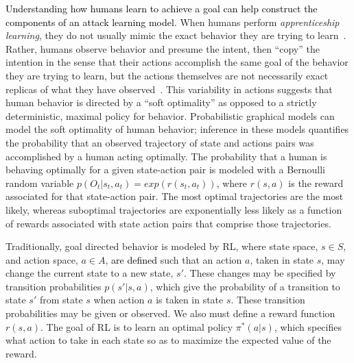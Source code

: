 \documentclass{article}
\newcommand\kjf[1]{\textcolor{black}{#1}}
\newcommand\nnn[1]{\textcolor{black}{#1}}
\begin{document}
\nnn{Understanding how humans \kjf{learn} to achieve a goal can help construct the components of an attack learning model.} 
When humans perform \emph{apprenticeship learning}, they do not usually mimic the exact behavior they are trying to learn~\cite{abbeel2004}. Rather, humans observe behavior and presume the intent, then ``copy'' the intention in the sense that their actions accomplish the same goal of the behavior they are trying to learn, but the actions themselves are not necessarily exact replicas of what they have observed~\cite{warneken2006}.
This variability in actions suggests that human behavior is directed by a ``soft optimality'' as opposed to a strictly deterministic, maximal policy for behavior. Probabilistic graphical models can model the soft optimality of human behavior; inference in these models quantifies the probability that an observed trajectory of state and actions pairs was accomplished by a human acting optimally. 
The probability that a human is behaving optimally for a given state-action pair is modeled with a Bernoulli random variable $p(O_t|s_t,a_t)=exp(r(s_t,a_t))$,
where $r(s,a)$ is the reward associated for that state-action pair. 
The most optimal trajectories are the most likely, whereas suboptimal trajectories are exponentially less likely as a function of rewards associated with state action pairs that comprise those trajectories. 

Traditionally, goal directed behavior is modeled by RL, where state space, $s \in S$, and action space, $a \in A$, \nnn{are defined} such that an action $a$, taken in state $s$, may change the current state to a new state, $s'$. These changes may be specified by transition probabilities $p(s'|s,a)$, which give the probability of a transition to state $s'$ from state $s$ when action $a$ is taken in state $s$. These transition probabilities may be given or observed. We also must define a reward function $r(s,a)$. The goal of RL is to learn an optimal policy $\pi^*(a|s)$, which specifies what action to take in each state so as to maximize the expected value of the reward. 
\end{document}
